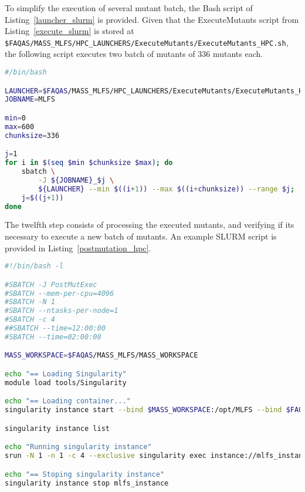 To simplify the execution of several mutant batch, the Bash script of Listing~\ref{launcher_slurm} is provided.
Given that the ExecuteMutants script from Listing~\ref{execute_slurm} is stored at \\\texttt{\$FAQAS/MASS\_MLFS/HPC\_LAUNCHERS/ExecuteMutants/ExecuteMutants\_HPC.sh}, the following script executes two batch of mutants of 336 mutants each.

\begin{lstlisting}[language=bash, label=launcher_slurm ,caption=Example of a Bash launcher for the ExecuteMutants\_HPC.sh script.]
#/bin/bash

LAUNCHER=$FAQAS/MASS_MLFS/HPC_LAUNCHERS/ExecuteMutants/ExecuteMutants_HPC.sh
JOBNAME=MLFS

min=0
max=600
chunksize=336

j=1
for i in $(seq $min $chunksize $max); do
    sbatch \
        -J ${JOBNAME}_$j \
        ${LAUNCHER} --min $((i+1)) --max $((i+chunksize)) --range $j;
    j=$((j+1))
done
\end{lstlisting}

The twelfth step consists of processing the executed mutants, and verifying if its necessary to execute a new batch of mutants. An example SLURM script is provided in Listing~\ref{postmutation_hpc}.

\begin{lstlisting}[language=bash, label=postmutation_hpc ,caption=Example of a SLURM launcher for the PostMutation step.]
#!/bin/bash -l

#SBATCH -J PostMutExec
#SBATCH --mem-per-cpu=4096
#SBATCH -N 1
#SBATCH --ntasks-per-node=1
#SBATCH -c 4
##SBATCH --time=12:00:00
#SBATCH --time=02:00:00

MASS_WORKSPACE=$FAQAS/MASS_MLFS/MASS_WORKSPACE

echo "== Loading Singularity"
module load tools/Singularity

echo "== Loading container..."
singularity instance start --bind $MASS_WORKSPACE:/opt/MLFS --bind $FAQAS/srcirorfaqas:/opt/srcirorfaqas $FAQAS/MASS_MLFS/blts.sif mlfs_instance

singularity instance list

echo "Running singularity instance"
srun -N 1 -n 1 -c 4 --exclusive singularity exec instance://mlfs_instance /bin/bash /opt/MLFS/PostMutation_HPC.sh 1 672

echo "== Stoping singularity instance"
singularity instance stop mlfs_instance
\end{lstlisting}

